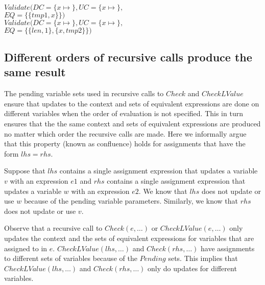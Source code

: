 \begin{small}
\begin{tabbing}
\>\\
\>\>$Validate(DC = \{x \mapsto$$\},
                   UC = \{x\mapsto $$\},$\\
\>\>\>\>\>\>$EQ = \{\{tmp1, x\}\})$\\
\>\>$Validate(DC = \{x \mapsto$$\}, 
                   UC = \{x\mapsto $$\},$\\
\>\>\>\>\>\>$EQ = \{\{len, 1\}, \{x, tmp2\}\})$\\
\end{tabbing}
\end{small}

\subsection{Different orders of recursive calls produce the same result}

The pending variable sets used in recursive calls to $Check$ and $CheckLValue$
ensure that updates to the context and sets of equivalent expressions are done on different variables when
the order of evaluation is not specified.  This in turn ensures that the the same context and sets of equivalent expressions
are produced no matter which order the recursive calls are made.   Here we informally argue 
that this property (known as confluence) holds for assignments that have  the form $lhs = rhs$.

Suppose that $lhs$
contains a single assignment expression that updates a variable $v$ with an expression $e1$ and 
$rhs$ contains a single assignment expression that updates  a variable $w$ with an expression $e2$.  
We know that $lhs$ does not update or use $w$ because of the pending variable parameters.  Similarly, 
we know that $rhs$ does not update or use $v$.

Observe that a recursive call to $Check(e, \ldots)$ or $CheckLValue(e, \ldots)$ only updates the context
and the sets of equivalent expressions for variables that are assigned to in $e$.   $CheckLValue(lhs,\ldots)$ and
$Check(rhs, \ldots)$ have assignments to different sets of variables because of the $Pending$ sets.  This
implies that $CheckLValue(lhs,\ldots)$ and $Check(rhs, \ldots)$ only do updates for different variables.


